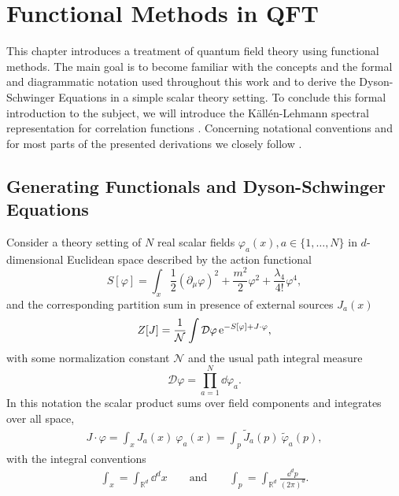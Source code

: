 \chapter{Functional Methods in QFT}\label{chap:methods}
This chapter introduces a treatment of quantum field theory using functional methods. The main goal is to become familiar with the concepts and the formal and diagrammatic notation used throughout this work and to derive the Dyson-Schwinger Equations \cite{Dyson1949, Schwinger1951} in a simple scalar theory setting. To conclude this formal introduction to the subject, we will introduce the K\"all\'{e}n-Lehmann spectral representation for correlation functions \cite{Kallen1952, Lehmann1954}. Concerning notational conventions and for most parts of the presented derivations we closely follow \cite{NPgaugeLecture}.

\section{Generating Functionals and Dyson-Schwinger Equations}
Consider a theory setting of $N$ real scalar fields $\varphi_a(x), a \in \{1,\dots,N\}$ in $d$-dimensional Euclidean space described by the action functional
\begin{equation}
S[\varphi]=\int_{x} \frac{1}{2}\left(\partial_{\mu} \varphi\right)^{2}+\frac{m^{2}}{2} \varphi^{2}+\frac{\lambda_4}{4 !} \varphi^{4}, \label{eqn:phi4_action}
\end{equation}
and the corresponding partition sum in presence of external sources $J_a(x)$ 
\begin{align}
	Z[J] = \frac{1}{\mathcal{N}} \int \mathcal{D}\varphi \operatorname{e}^{-S[\varphi] + J\cdot\varphi},
	\label{eqn:partition}
\end{align}
with some normalization constant $\mathcal{N}$ and the usual path integral measure 
\begin{equation}
\mathcal{D}\varphi = \prod_{a=1}^{N} \dd \varphi_a.
\end{equation} 
In this notation the scalar product sums over field components and integrates over all space,
\begin{align}
	J\cdot\varphi = \int_x J_a(x) \ \varphi_a(x) = \int_p \tilde{J}_a(p) \ \tilde{\varphi}_a(p),
\end{align}
with the integral conventions
\begin{align}
\int_x = \int_{\mathbb{R}^d} \dd^d x \qquad \text{and} \qquad \int_p = \int_{\mathbb{R}^d} \frac{\dd^d p}{(2\pi)^d}.	
\end{align}

